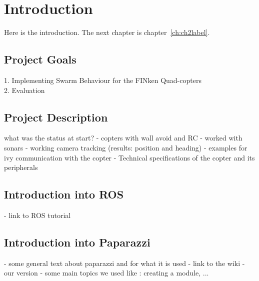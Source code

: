 \chapter{Introduction}\label{ch:introduction}
Here is the introduction. The next chapter is chapter~\ref{ch:ch2label}.

\section{Project Goals}
1. Implementing Swarm Behaviour for the FINken Quad-copters \\
2. Evaluation

\section{Project Description}
what was the status at start?
 - copters with wall avoid and RC
     - worked with sonars
 - working camera tracking (results: position and heading)
 - examples for ivy communication with the copter
 - Technical specifications of the copter and its peripherals

\section{Introduction into ROS}
- link to ROS tutorial

\section{Introduction into Paparazzi}
- some general text about paparazzi and for what it is used
- link to the wiki
- our version
- some main topics we used like : creating a module, ...

